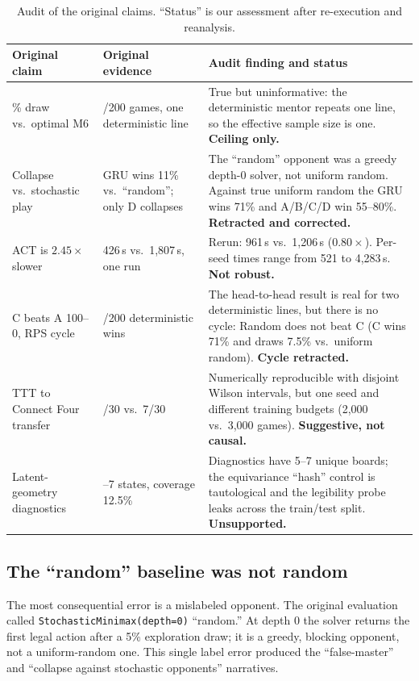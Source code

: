 \documentclass[conference]{IEEEtran}
\begin{document}
\begin{table}[t]
\centering
\caption{Audit of the original claims. ``Status'' is our assessment after re-execution and reanalysis.}
\label{tab:audit}
\setlength{\tabcolsep}{3pt}
\small
\begin{tabular}{@{}>{\raggedright\arraybackslash}p{}>{\raggedright\arraybackslash}p{}>{\raggedright\arraybackslash}p{}@{}}
\toprule
\textbf{Original claim} & \textbf{Original evidence} & \textbf{Audit finding and status} \\
\midrule
100\% draw vs.\ optimal M6 & 200/200 games, one deterministic line & True but uninformative: the deterministic mentor repeats one line, so the effective sample size is one. \textbf{Ceiling only.} \\
\addlinespace
Collapse vs.\ stochastic play & GRU wins 11\% vs.\ ``random''; only D collapses & The ``random'' opponent was a greedy depth-0 solver, not uniform random. Against true uniform random the GRU wins 71\% and A/B/C/D win 55--80\%. \textbf{Retracted and corrected.} \\
\addlinespace
ACT is $2.45\times$ slower & 4{,}426\,s vs.\ 1{,}807\,s, one run & Rerun: 961\,s vs.\ 1{,}206\,s ($0.80\times$). Per-seed times range from 521 to 4{,}283\,s. \textbf{Not robust.} \\
\addlinespace
C beats A 100--0, RPS cycle & 200/200 deterministic wins & The head-to-head result is real for two deterministic lines, but there is no cycle: Random does not beat C (C wins 71\% and draws 7.5\% vs.\ uniform random). \textbf{Cycle retracted.} \\
\addlinespace
TTT to Connect Four transfer & 24/30 vs.\ 7/30 & Numerically reproducible with disjoint Wilson intervals, but one seed and different training budgets (2{,}000 vs.\ 3{,}000 games). \textbf{Suggestive, not causal.} \\
\addlinespace
Latent-geometry diagnostics & 5--7 states, coverage 12.5\% & Diagnostics have 5--7 unique boards; the equivariance ``hash'' control is tautological and the legibility probe leaks across the train/test split. \textbf{Unsupported.} \\
\bottomrule
\end{tabular}
\end{table}

\subsection{The ``random'' baseline was not random}
The most consequential error is a mislabeled opponent. The original evaluation called \texttt{StochasticMinimax(depth=0)} ``random.'' At depth 0 the solver returns the first legal action after a 5\% exploration draw; it is a greedy, blocking opponent, not a uniform-random one. This single label error produced the ``false-master'' and ``collapse against stochastic opponents'' narratives.
\end{document}
